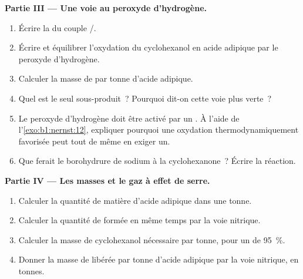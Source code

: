 \begin{problem}
\medskip
\noindent\textbf{Partie III --- Une voie au peroxyde d'hydrogène.}
\begin{enumerate}[resume]
  \item Écrire la  du couple /.
  \item Écrire et équilibrer l'oxydation du cyclohexanol en acide
        adipique par le peroxyde d'hydrogène.
  \item Calculer la masse de  par tonne d'acide adipique.
  \item Quel est le seul sous-produit~? Pourquoi dit-on cette voie plus
        verte~?
  \item Le peroxyde d'hydrogène doit être activé par un . À
        l'aide de l'\cref{exo:b1:nernst:12}, expliquer pourquoi une
        oxydation thermodynamiquement favorisée peut tout de même en
        exiger un.
  \item Que ferait le borohydrure de sodium à la cyclohexanone~? Écrire
        la réaction.
\end{enumerate}

\medskip
\noindent\textbf{Partie IV --- Les masses et le gaz à effet de serre.}
\begin{enumerate}[resume]
  \item Calculer la quantité de matière d'acide adipique dans une tonne.
  \item Calculer la quantité de  formée en même temps par la voie
        nitrique.
  \item Calculer la masse de cyclohexanol nécessaire par tonne, pour un
         de \qty{95}{\percent}.
  \item Donner la masse de  libérée par tonne d'acide adipique
        par la voie nitrique, en tonnes.
\end{enumerate}
\end{problem}
